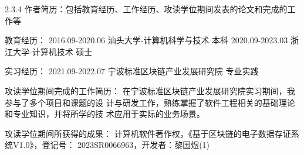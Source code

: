 \cleardoublepage
{}
2.3.4 作者简历：包括教育经历、工作经历、攻读学位期间发表的论文和完成的工作等

教育经历： 
2016.09-2020.06  汕头大学-计算机科学与技术  本科 
2020.09-2023.03  浙江大学-计算机技术  硕士 
 
 
 
实习经历： 
2021.09-2022.07  宁波标准区块链产业发展研究院  专业实践 
 
 
 
攻读学位期间完成的工作简历： 
在宁波标准区块链产业发展研究院实习期间，我参与了多个项目和课题的设
计与研发工作，熟练掌握了软件工程相关的基础理论和专业知识，并将所学的技
术应用于实际的业务场景。 
 
攻读学位期间所获得的成果： 
计算机软件著作权，《基于区块链的电子数据存证系统V1.0》，登记号：
2023SR0066963，开发者：黎国煜(1) 
